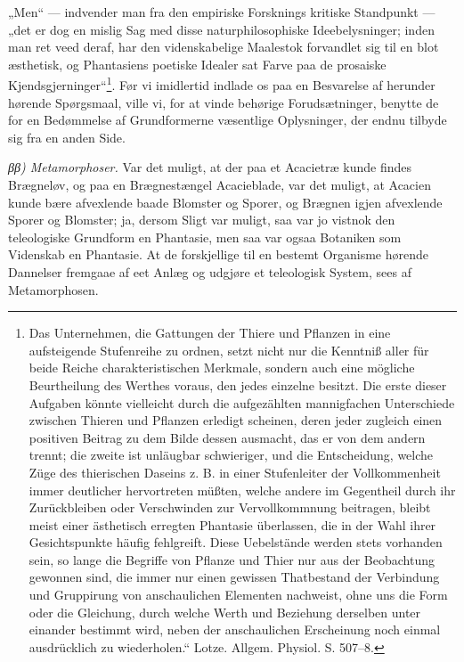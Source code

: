 \documentclass[12pt,a4paper]{book}
\begin{document}
„Men“ --- indvender man fra den empiriske Forsknings kritiske Standpunkt
--- „det er dog en mislig Sag med disse naturphilosophiske
Ideebelysninger; inden man ret veed deraf, har den videnskabelige
Maalestok forvandlet sig til en blot æsthetisk, og Phantasiens poetiske
Idealer sat Farve paa de prosaiske Kjendsgjerninger“\footnote{Das
Unternehmen, die Gattungen der Thiere und Pflanzen in eine aufsteigende
Stufenreihe zu ordnen, setzt nicht nur die Kenntniß aller für beide
Reiche charakteristischen Merkmale, sondern auch eine mögliche
Beurtheilung des Werthes voraus, den jedes einzelne besitzt. Die erste
dieser Aufgaben könnte vielleicht durch die aufgezählten mannigfachen
Unterschiede zwischen Thieren und Pflanzen erledigt scheinen, deren
jeder zugleich einen positiven Beitrag zu dem Bilde dessen ausmacht, das
er von dem andern trennt; die zweite ist unläugbar schwieriger, und die
Entscheidung, welche Züge des thierischen Daseins z. B. in einer
Stufenleiter der Vollkommenheit immer deutlicher hervortreten müßten,
welche andere im Gegentheil durch ihr Zurückbleiben oder Verschwinden
zur Vervollkommnung beitragen, bleibt meist einer ästhetisch erregten
Phantasie überlassen, die in der Wahl ihrer Gesichtspunkte häufig
fehlgreift. Diese Uebelstände werden stets vorhanden sein, so lange die
Begriffe von Pflanze und Thier nur aus der Beobachtung gewonnen sind,
die immer nur einen gewissen Thatbestand der Verbindung und Gruppirung
von anschaulichen Elementen nachweist, ohne uns die Form oder die
Gleichung, durch welche Werth und Beziehung derselben unter einander
bestimmt wird, neben der anschaulichen Erscheinung noch einmal
ausdrücklich zu wiederholen.“ Lotze. Allgem. Physiol. S. 507--8.}. Før
vi imidlertid indlade os
paa en Besvarelse af herunder hørende Spørgsmaal, ville vi, for at vinde
behørige Forudsætninger, benytte de for en Bedømmelse af Grundformerne
væsentlige Oplysninger, der endnu tilbyde sig fra en anden Side.

\emph{ββ) Metamorphoser.} Var det muligt, at der paa et Acacietræ kunde
findes Brægneløv, og paa en Brægnestængel Acacieblade, var det muligt,
at Acacien kunde bære afvexlende baade Blomster og Sporer, og Brægnen
igjen afvexlende Sporer og Blomster; ja, dersom Sligt var muligt, saa
var jo vistnok den teleologiske Grundform en Phantasie, men saa var
ogsaa Botaniken som Videnskab en Phantasie. At de forskjellige til en
bestemt Organisme hørende Dannelser fremgaae af eet Anlæg og udgjøre et
teleologisk System, sees af Metamorphosen.
\end{document}
